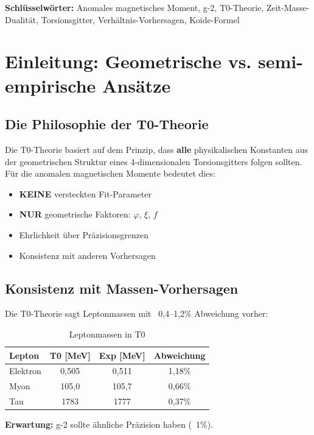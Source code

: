 	\textbf{Schlüsselwörter:} Anomales magnetisches Moment, g-2, T0-Theorie, Zeit-Masse-Dualität, Torsionsgitter, Verhältnis-Vorhersagen, Koide-Formel
	
	
	\section{Einleitung: Geometrische vs. semi-empirische Ansätze}
	
	\subsection{Die Philosophie der T0-Theorie}
	
	Die T0-Theorie basiert auf dem Prinzip, dass \textbf{alle} physikalischen Konstanten aus der geometrischen Struktur eines 4-dimensionalen Torsionsgitters folgen sollten. Für die anomalen magnetischen Momente bedeutet dies:
	
	\begin{itemize}
		\item \textbf{KEINE} versteckten Fit-Parameter
		\item \textbf{NUR} geometrische Faktoren: $\varphi$, $\xi$, $f$
		\item Ehrlichkeit über Präzisionsgrenzen
		\item Konsistenz mit anderen Vorhersagen
	\end{itemize}
	
	\subsection{Konsistenz mit Massen-Vorhersagen}
	
	Die T0-Theorie sagt Leptonmassen mit ~0{,}4--1{,}2\% Abweichung vorher:
	
	\begin{table}[h]
		\centering
		\begin{tabular}{lccc}
			\toprule
			\textbf{Lepton} & \textbf{T0 [MeV]} & \textbf{Exp [MeV]} & \textbf{Abweichung} \\
			\midrule
			Elektron & 0{,}505 & 0{,}511 & 1{,}18\% \\
			Myon & 105{,}0 & 105{,}7 & 0{,}66\% \\
			Tau & 1783 & 1777 & 0{,}37\% \\
			\bottomrule
		\end{tabular}
		\caption{Leptonmassen in T0}
	\end{table}
	
	\textbf{Erwartung:} g-2 sollte ähnliche Präzision haben (~1\%).
	
